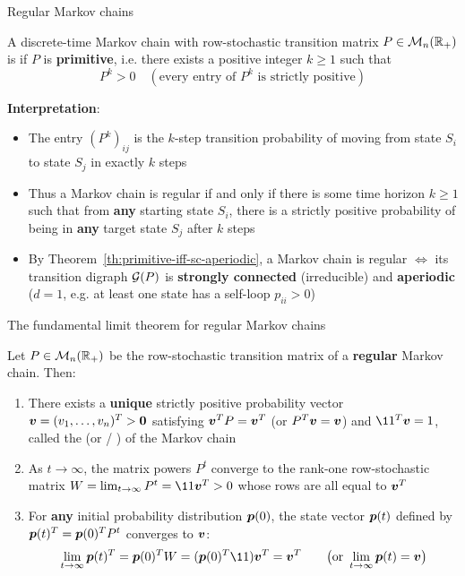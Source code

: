 \documentclass[aspectratio=169]{beamer}\usepackage[]{graphicx}\usepackage[]{xcolor}
\begin{document}
\begin{frame}{Regular Markov chains}
\begin{importantdefinition}
A discrete-time Markov chain with row-stochastic transition matrix $P \in \mathcal{M}_n(\mathbb{R}_+)$ is  if $P$ is \textbf{primitive}, i.e. there exists a positive integer $k \ge 1$ such that
\[
P^k > 0 \quad (\text{every entry of } P^k \text{ is strictly positive})
\]
\end{importantdefinition}
\vfill
\textbf{Interpretation}:
\begin{itemize}
\item The entry $(P^k)_{ij}$ is the $k$-step transition probability of moving from state $S_i$ to state $S_j$ in exactly $k$ steps
\item Thus a Markov chain is regular if and only if there is some time horizon $k \ge 1$ such that from \textbf{any} starting state $S_i$, there is a strictly positive probability of being in \textbf{any} target state $S_j$ after $k$ steps
\item By Theorem~\ref{th:primitive-iff-sc-aperiodic}, a Markov chain is regular $\iff$ its transition digraph $\mathcal{G}(P)$ is \textbf{strongly connected} (irreducible) and \textbf{aperiodic} ($d = 1$, e.g. at least one state has a self-loop $p_{ii} > 0$)
\end{itemize}
\end{frame}

\begin{frame}{The fundamental limit theorem for regular Markov chains}
\begin{importanttheorem}
\label{th:regular-mc-limit}
Let $P \in \mathcal{M}_n(\mathbb{R}_+)$ be the row-stochastic transition matrix of a \textbf{regular} Markov chain. Then:
\begin{enumerate}
\item There exists a \textbf{unique} strictly positive probability vector $\bv = (v_1, \ldots, v_n)^T > \b0$ satisfying $\bm{v}^T P = \bm{v}^T$ (or $P^T\bm{v} = \bm{v}$) and $\11^T\bv = 1$, called the  (or  / ) of the Markov chain
\item As $t \to \infty$, the matrix powers $P^t$ converge to the rank-one row-stochastic matrix $W = \lim_{t \to \infty} P^t = \11\bv^T > 0$ whose rows are all equal to $\bm{v}^T$
\item For \textbf{any} initial probability distribution $\bm{p}(0)$, the state vector $\bm{p}(t)$ defined by $\bm{p}(t)^T = \bm{p}(0)^T P^t$ converges to $\bm{v}$:
\[
\lim_{t \to \infty} \bp(t)^T = \bp(0)^T W = (\bp(0)^T \11)\bv^T = \bv^T \qquad \bigl(\text{or } \lim_{t \to \infty} \bp(t) = \bv\bigr)
\]
\end{enumerate}
\end{importanttheorem}
\end{frame}
\end{document}
